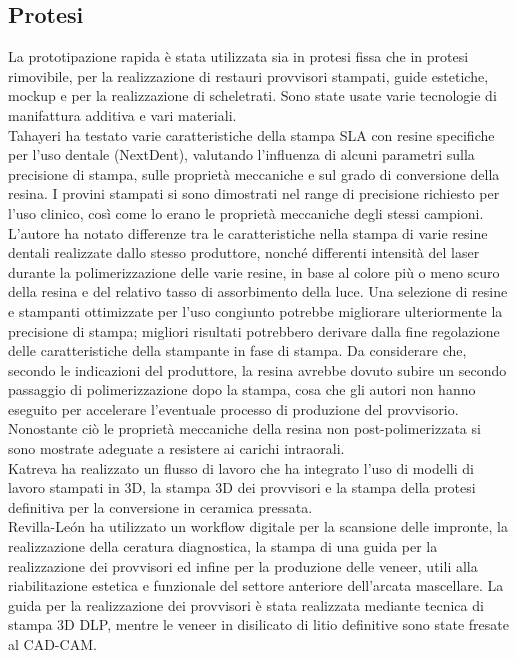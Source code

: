 \subsection{Protesi}
La prototipazione rapida è stata utilizzata sia in protesi fissa che in protesi rimovibile, per la realizzazione di restauri provvisori stampati, guide estetiche, mockup e per la realizzazione di scheletrati. Sono state usate varie tecnologie di manifattura additiva e vari materiali.\\
Tahayeri \parencite{Reference98} ha testato varie caratteristiche della stampa SLA con resine specifiche per l'uso dentale (NextDent), valutando l'influenza di alcuni parametri sulla precisione di stampa, sulle proprietà meccaniche e sul grado di conversione della resina. I provini stampati si sono dimostrati nel range di precisione richiesto per l'uso clinico, così come lo erano le proprietà meccaniche degli stessi campioni. L'autore ha notato differenze tra le caratteristiche nella stampa di varie resine dentali realizzate dallo stesso produttore, nonché differenti intensità del laser durante la polimerizzazione delle varie resine, in base al colore più o meno scuro della resina e del relativo tasso di assorbimento della luce. Una selezione di resine e stampanti ottimizzate per l'uso congiunto potrebbe migliorare ulteriormente la precisione di stampa; migliori risultati potrebbero derivare dalla fine regolazione delle caratteristiche della stampante in fase di stampa.
Da considerare che, secondo le indicazioni del produttore, la resina avrebbe dovuto subire un secondo passaggio di polimerizzazione dopo la stampa, cosa che gli autori non hanno eseguito per accelerare l'eventuale processo di produzione del provvisorio. Nonostante ciò le proprietà meccaniche della resina non post-polimerizzata si sono mostrate adeguate a resistere ai carichi intraorali. \\
Katreva \parencite{Reference99} ha realizzato un flusso di lavoro che ha integrato l'uso di modelli di lavoro stampati in 3D, la stampa 3D dei provvisori e la stampa della protesi definitiva per la conversione in ceramica pressata.\\
Revilla-León \parencite{Reference100} ha utilizzato un workflow digitale per la scansione delle impronte, la realizzazione della ceratura diagnostica, la stampa di una guida per la realizzazione dei provvisori ed infine per la produzione delle veneer, utili alla riabilitazione estetica e funzionale del settore anteriore dell'arcata mascellare. La guida per la realizzazione dei provvisori è stata realizzata mediante tecnica di stampa 3D DLP, mentre le veneer in disilicato di litio definitive sono state fresate al CAD-CAM.\\
